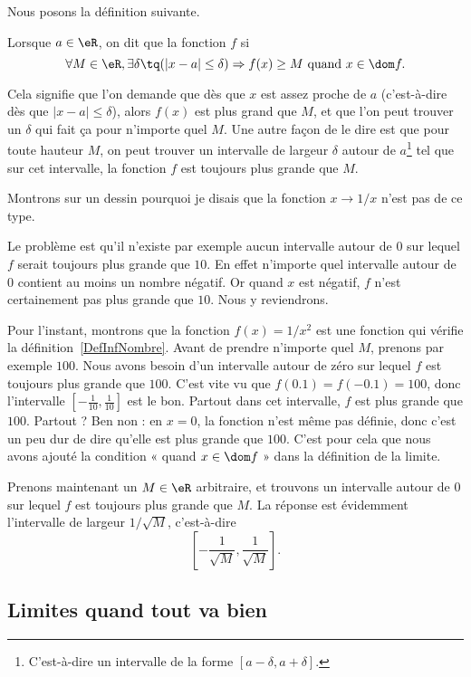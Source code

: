 Nous posons la définition suivante.
\begin{definition}      \label{DefInfNombre}
	Lorsque $a\in\eR$, on dit que la fonction $f$  si
	\[
		\forall M\in\eR,\exists \delta\tq (| x-a |\leq \delta )\Rightarrow f(x)\geq M\text{ quand }x\in\dom f.
	\]
\end{definition}
Cela signifie que l'on demande que dès que $x$ est assez proche de $a$ (c'est-à-dire dès que $| x-a |\leq\delta$), alors $f(x)$ est plus grand que $M$, et que l'on peut trouver un $\delta$ qui fait ça pour n'importe quel $M$. Une autre façon de le dire est que pour toute hauteur $M$, on peut trouver un intervalle de largeur $\delta$ autour de $a$\footnote{C'est-à-dire un intervalle de la forme $[a-\delta,a+\delta]$.} tel que sur cet intervalle, la fonction $f$ est toujours plus grande que $M$.

Montrons sur un dessin pourquoi je disais que la fonction $x\to 1/x$ n'est pas de ce type.


Le problème est qu'il n'existe par exemple aucun intervalle autour de $0$ sur lequel $f$ serait toujours plus grande que $10$. En effet n'importe quel intervalle autour de $0$ contient au moins un nombre négatif. Or quand $x$ est négatif, $f$ n'est certainement pas plus grande que $10$. Nous y reviendrons.

Pour l'instant, montrons que la fonction $f(x)=1/x^2$ est une fonction qui vérifie la définition~\ref{DefInfNombre}.  Avant de prendre n'importe quel $M$, prenons par exemple $100$. Nous avons besoin d'un intervalle autour de zéro sur lequel $f$ est toujours plus grande que $100$. C'est vite vu que $f(0.1)=f(-0.1)=100$, donc l'intervalle $[-\frac{ 1 }{ 10 },\frac{1}{ 10 }]$ est le bon. Partout dans cet intervalle, $f$ est plus grande que $100$. Partout ? Ben non : en $x=0$, la fonction n'est même pas définie, donc c'est un peu dur de dire qu'elle est plus grande que $100$. C'est pour cela que nous avons ajouté la condition « quand $x\in\dom f$ » dans la définition de la limite.

Prenons maintenant un $M\in\eR$ arbitraire, et trouvons un intervalle autour de $0$ sur lequel $f$ est toujours plus grande que $M$. La réponse est évidemment l'intervalle de largeur $1/\sqrt{M}$, c'est-à-dire
\[
	\left[ -\frac{ 1 }{ \sqrt{M} },\frac{ 1 }{ \sqrt{M} } \right].
\]

\subsection{Limites quand tout va bien}

